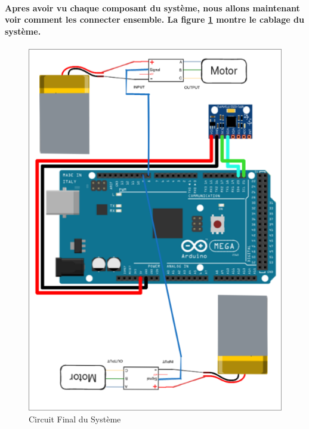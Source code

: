 \paragraph{Apres avoir vu chaque composant du système, nous allons maintenant voir comment les connecter ensemble. La figure \ref{fig:circuit-final} montre le cablage du système.}
\paragraph*{}
\begin{figure}[!htpb]
	\centering
	\includegraphics[width=0.9\linewidth]{Figures/final-circuit.png}
	\caption{Circuit Final du Système}
	\label{fig:circuit-final}
\end{figure}

\newpage
